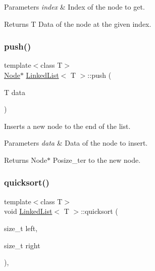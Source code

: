 \begin{DoxyParams}{Parameters}
{\em index} & Index of the node to get. \\
\hline
\end{DoxyParams}
\begin{DoxyReturn}{Returns}
T Data of the node at the given index. 
\end{DoxyReturn}
\mbox{\label{classLinkedList_a3a1e6c2009b611fb4416574178b316a3}} 
\subsubsection{\texorpdfstring{push()}{push()}}
{\footnotesize\ttfamily template$<$class T$>$ \\
\hyperlink{structLinkedList_1_1Node}{Node}$\ast$ \hyperlink{classLinkedList}{Linked\+List}$<$ T $>$\+::push (\begin{DoxyParamCaption}\item[{T}]{data }\end{DoxyParamCaption})\hspace{0.3cm}{\ttfamily [inline]}}



Inserts a new node to the end of the list. 


\begin{DoxyParams}{Parameters}
{\em data} & Data of the node to insert. \\
\hline
\end{DoxyParams}
\begin{DoxyReturn}{Returns}
Node$\ast$ Posize\+\_\+ter to the new node. 
\end{DoxyReturn}
\mbox{\label{classLinkedList_a38612b71d816fec54ea379d0b8daec76}} 
\subsubsection{\texorpdfstring{quicksort()}{quicksort()}}
{\footnotesize\ttfamily template$<$class T$>$ \\
void \hyperlink{classLinkedList}{Linked\+List}$<$ T $>$\+::quicksort (\begin{DoxyParamCaption}\item[{size\+\_\+t}]{left,  }\item[{size\+\_\+t}]{right }\end{DoxyParamCaption})\hspace{0.3cm}{\ttfamily [inline]}, {\ttfamily [private]}}



